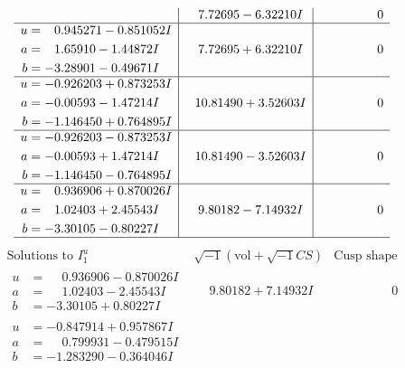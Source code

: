 \documentclass[1p]{elsarticle_modified}
\theoremstyle{definition}
\newcommand{\I}{\sqrt{-1}}
\begin{document}
$$\begin{array}{c|c|c}
 & \phantom{-}7.72695 - 6.32210 I & \phantom{-0.000000 } 0 \\ \hline\begin{aligned}
u &= \phantom{-}0.945271 - 0.851052 I \\
a &= \phantom{-}1.65910 - 1.44872 I \\
b &= -3.28901 - 0.49671 I\end{aligned}
 & \phantom{-}7.72695 + 6.32210 I & \phantom{-0.000000 } 0 \\ \hline\begin{aligned}
u &= -0.926203 + 0.873253 I \\
a &= -0.00593 - 1.47214 I \\
b &= -1.146450 + 0.764895 I\end{aligned}
 & \phantom{-}10.81490 + 3.52603 I & \phantom{-0.000000 } 0 \\ \hline\begin{aligned}
u &= -0.926203 - 0.873253 I \\
a &= -0.00593 + 1.47214 I \\
b &= -1.146450 - 0.764895 I\end{aligned}
 & \phantom{-}10.81490 - 3.52603 I & \phantom{-0.000000 } 0 \\ \hline\begin{aligned}
u &= \phantom{-}0.936906 + 0.870026 I \\
a &= \phantom{-}1.02403 + 2.45543 I \\
b &= -3.30105 - 0.80227 I\end{aligned}
 & \phantom{-}9.80182 - 7.14932 I & \phantom{-0.000000 } 0\\
 \hline 
 \end{array}$$\newpage$$\begin{array}{c|c|c}  
\text{Solutions to }I^u_{1}& \I (\text{vol} + \sqrt{-1}CS) & \text{Cusp shape}\\
 \hline 
\begin{aligned}
u &= \phantom{-}0.936906 - 0.870026 I \\
a &= \phantom{-}1.02403 - 2.45543 I \\
b &= -3.30105 + 0.80227 I\end{aligned}
 & \phantom{-}9.80182 + 7.14932 I & \phantom{-0.000000 } 0 \\ \hline\begin{aligned}
u &= -0.847914 + 0.957867 I \\
a &= \phantom{-}0.799931 - 0.479515 I \\
b &= -1.283290 - 0.364046 I\end{aligned}

\end{array}$$
\end{document}
